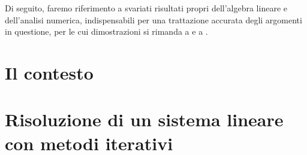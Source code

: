 \documentclass[
	a4paper,
	twoside,
	12pt
]{book}
\theoremstyle{teorema}
\theoremstyle{stileEsempio}
\begin{document}
Di seguito, faremo riferimento a svariati risultati propri dell'algebra lineare e dell'analisi numerica, indispensabili per una trattazione accurata degli 
argomenti in questione, per le cui dimostrazioni si rimanda a \cite{Betti2000} e a \cite{Quarteroni2000}.
\section{Il contesto}

\section{Risoluzione di un sistema lineare con metodi iterativi}

\backmatter

%
\printbibliography
{}
%
\end{document}
